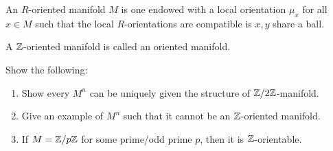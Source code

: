 \begin{defn}
    An $R$-oriented manifold $M$ is one endowed with a local orientation $\mu_x$ for all $x\in M$ such that the local $R$-orientations are compatible is $x,y$ share a ball.

    A $\mathbb{Z}$-oriented manifold is called an oriented manifold.
\end{defn}

\begin{prob}[HW(4.2)]
    Show the following:
    \begin{enumerate}
        \item Show every $M^n$ can be uniquely given the structure of $\mathbb{Z}/2\mathbb{Z}$-manifold.
        \item Give an example of $M^n$ such that it cannot be an $\mathbb{Z}$-oriented manifold.
        \item If $M=\mathbb{Z}/p\mathbb{Z}$ for some prime/odd prime $p$, then it is $\mathbb{Z}$-orientable.
    \end{enumerate}
\end{prob}


